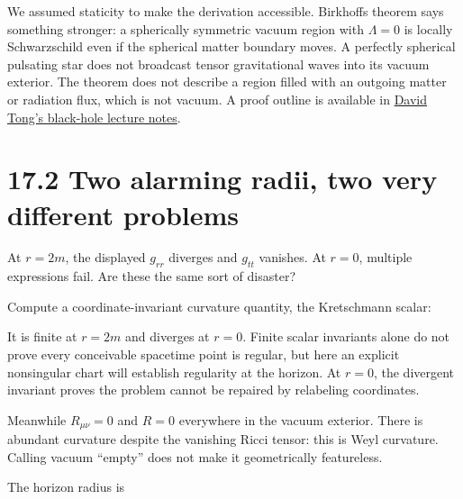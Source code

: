 \documentclass[
  11pt,
  letterpaper,
  oneside,
  openany]{scrbook}
\begin{document}
We assumed staticity to make the derivation accessible.
Birkhoff\textquotesingle s theorem says something stronger: a
spherically symmetric vacuum region with \(\Lambda=0\) is locally
Schwarzschild even if the spherical matter boundary moves. A perfectly
spherical pulsating star does not broadcast tensor gravitational waves
into its vacuum exterior. The theorem does not describe a region filled
with an outgoing matter or radiation flux, which is not vacuum. A proof
outline is available in
\href{https://davidtong.org/pdfs/teaching/general-relativity/gr6.pdf}{David
Tong's black-hole lecture notes}.

\hypertarget{two-alarming-radii-two-very-different-problems}{%
\section{17.2 Two alarming radii, two very different
problems}\label{two-alarming-radii-two-very-different-problems}}

At \(r=2m\), the displayed \(g_{rr}\) diverges and \(g_{tt}\) vanishes.
At \(r=0\), multiple expressions fail. Are these the same sort of
disaster?

Compute a coordinate-invariant curvature quantity, the Kretschmann
scalar:

\begin{center}
\begingroup
{}
\ifdim\wd\grmathbox>\linewidth
\resizebox{\linewidth}{!}{\usebox{\grmathbox}}
\else\usebox{\grmathbox}\fi
\endgroup
\end{center}

It is finite at \(r=2m\) and diverges at \(r=0\). Finite scalar
invariants alone do not prove every conceivable spacetime point is
regular, but here an explicit nonsingular chart will establish
regularity at the horizon. At \(r=0\), the divergent invariant proves
the problem cannot be repaired by relabeling coordinates.

Meanwhile \(R_{\mu\nu}=0\) and \(R=0\) everywhere in the vacuum
exterior. There is abundant curvature despite the vanishing Ricci
tensor: this is Weyl curvature. Calling vacuum ``empty'' does not make
it geometrically featureless.

The horizon radius is

\begin{center}
\begingroup
{}
\ifdim\wd\grmathbox>\linewidth
\resizebox{\linewidth}{!}{\usebox{\grmathbox}}
\else\usebox{\grmathbox}\fi
\endgroup
\end{center}
\end{document}
